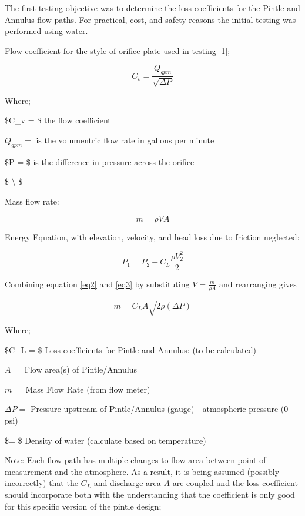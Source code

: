 \documentclass[11pt]{article}
\begin{document}
The first testing objective was to determine the loss coefficients for
the Pintle and Annulus flow paths. For practical, cost, and safety
reasons the initial testing was performed using water.

Flow coefficient for the style of orifice plate used in testing {[}1{]};

\begin{equation}
C_v = \frac{Q_{gpm}}{\sqrt{\Delta P}}
\label{eq1}
\tag{1}
\end{equation}

Where;

\$C\_v = \$ the flow coefficient

\(Q_{gpm} =\) is the volumentric flow rate in gallons per minute

\$\Delta P = \$ is the difference in pressure across the orifice

\$ \textbackslash{} \$

Mass flow rate:

\begin{equation}
 \dot{m} = \rho VA
\label{eq2}
\tag{2}
\end{equation}

Energy Equation, with elevation, velocity, and head loss due to friction
neglected:

\begin{equation}
P_1  = P_2 + C_L\frac{\rho V_2^2}{2}
\label{eq3}
\tag{3}
\end{equation}

Combining equation \ref{eq2} and \ref{eq3} by substituting
\(V = \frac{\dot{m}}{\rho A}\) and rearranging gives

\begin{equation}
\dot{m} = C_LA \sqrt{2\rho(\Delta P)}
\label{eq4}
\tag{4}
\end{equation}

Where;

\$C\_L = \$ Loss coefficients for Pintle and Annulus: (to be calculated)

\(A =\) Flow area(s) of Pintle/Annulus

\(\dot{m} =\) Mass Flow Rate (from flow meter)

\(\Delta P =\) Pressure upstream of Pintle/Annulus (gauge) - atmospheric
pressure (0 psi)

\$\rho = \$ Density of water (calculate based on temperature)

Note: Each flow path has multiple changes to flow area between point of
measurement and the atmosphere. As a result, it is being assumed
(possibly incorrectly) that the \(C_L\) and discharge area \(A\) are
coupled and the loss coefficient should incorporate both with the
understanding that the coefficient is only good for this specific
version of the pintle design;
\end{document}
